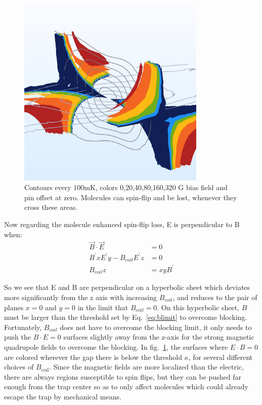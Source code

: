 \documentclass[%
 reprint,
 amsmath,amssymb,
 aps,
prl,
]{revtex4-1}
\begin{document}
\begin{figure}
\includegraphics[width=90mm]{Loss_Surface_Chunks_0-320_0.jpeg}%
\caption{
Contours every 100mK, colors 0,20,40,80,160,320 G bias field and pin offset at zero. Molecules can spin-flip and be lost, whenever they cross these areas.
\label{fig:LSurfs}}
\end{figure}

Now regarding the molecule enhanced spin-flip loss, E is perpendicular to B when:
\begin{eqnarray}
\vec{B}\cdot \vec{E} &= 0\\
B^\prime x E^\prime y - B_{coil}  E^\prime z &= 0\\
B_{coil}z &= xyB^\prime
\end{eqnarray}

So we see that E and B are perpendicular on a hyperbolic sheet which deviates more significantly from the z axis with increasing $B_{coil}$, and reduces to the pair of planes $x=0$ and $y=0$ in the limit that $B_{coil} = 0$. On this hyperbolic sheet, $B$ must be larger than the threshold set by Eq.~\ref{eq:blimit} to overcome blocking. Fortunately, $B_{coil}$ does not have to overcome the blocking limit, it only needs to push the $B\cdot E=0$ surfaces slightly away from the z-axis for the strong magnetic quadrupole fields to overcome the blocking. In fig.~\ref{fig:LSurfs}, the surfaces where $E\cdot B=0$ are colored wherever the gap there is below the threshold $\kappa$, for several different choices of $B_\text{coil}$. Since the magnetic fields are more localized than the electric, there are always regions susceptible to spin flips, but they can be pushed far enough from the trap center so as to only affect molecules which could already escape the trap by mechanical means. 
\end{document}
